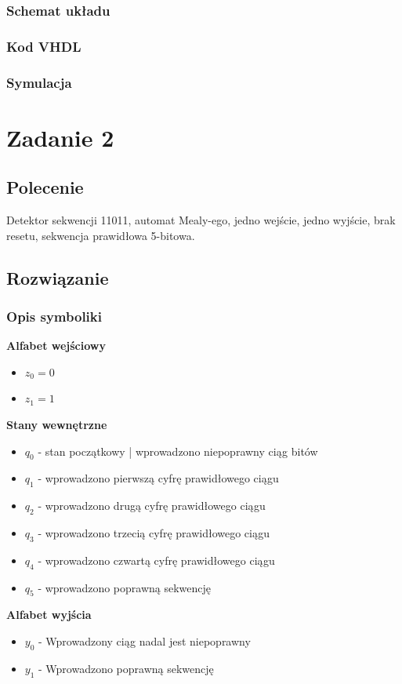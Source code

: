 \documentclass[a4paper,12pt]{extarticle}  %
\begin{document}
\subsubsection{Schemat układu}
\subsubsection{Kod VHDL}
% 
\subsubsection{Symulacja}
\section{Zadanie 2}
\subsection{Polecenie}
Detektor sekwencji 11011, automat Mealy-ego, jedno wejście, jedno wyjście, brak resetu, sekwencja prawidłowa 5-bitowa.
\subsection{Rozwiązanie}
\subsubsection{Opis symboliki}
\textbf{Alfabet wejściowy}
\begin{itemize}
    \item $z_0 = 0$
    \item $z_1 = 1$
\end{itemize}
\textbf{Stany wewnętrzne}
\begin{itemize}
    \item $q_0$ - stan początkowy | wprowadzono niepoprawny ciąg bitów
    \item $q_1$ - wprowadzono pierwszą cyfrę prawidłowego ciągu
    \item $q_2$ - wprowadzono drugą cyfrę prawidłowego ciągu
    \item $q_3$ - wprowadzono trzecią cyfrę prawidłowego ciągu
    \item $q_4$ - wprowadzono czwartą cyfrę prawidłowego ciągu
    \item $q_5$ - wprowadzono poprawną sekwencję
\end{itemize}
\textbf{Alfabet wyjścia}
\begin{itemize}
    \item $y_0$ - Wprowadzony ciąg nadal jest niepoprawny
    \item $y_1$ - Wprowadzono poprawną sekwencję
\end{itemize}
\end{document}
